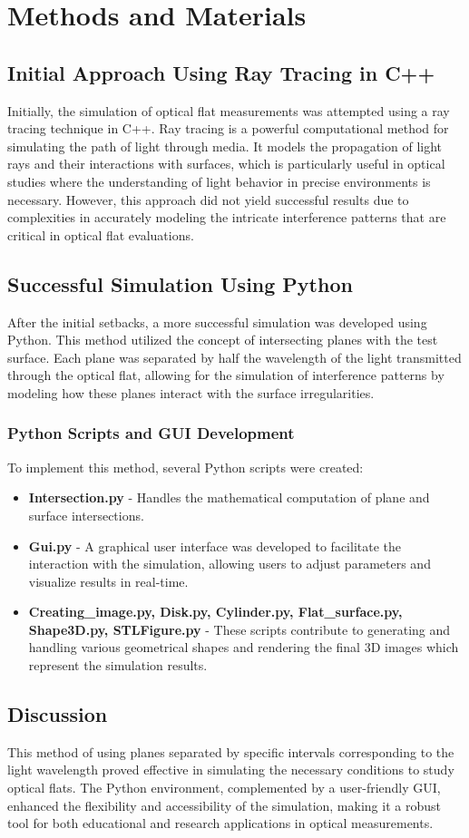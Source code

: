 \documentclass[../main.tex]{subfiles}
\begin{document}
\chapter{Methods and Materials}

\section{Initial Approach Using Ray Tracing in C++}
Initially, the simulation of optical flat measurements was attempted using a ray tracing technique in C++. Ray tracing is a powerful computational method for simulating the path of light through media. It models the propagation of light rays and their interactions with surfaces, which is particularly useful in optical studies where the understanding of light behavior in precise environments is necessary. However, this approach did not yield successful results due to complexities in accurately modeling the intricate interference patterns that are critical in optical flat evaluations.

\section{Successful Simulation Using Python}
After the initial setbacks, a more successful simulation was developed using Python. This method utilized the concept of intersecting planes with the test surface. Each plane was separated by half the wavelength of the light transmitted through the optical flat, allowing for the simulation of interference patterns by modeling how these planes interact with the surface irregularities.

\subsection{Python Scripts and GUI Development}
To implement this method, several Python scripts were created:
\begin{itemize}
    \item \textbf{Intersection.py} - Handles the mathematical computation of plane and surface intersections.
    \item \textbf{Gui.py} - A graphical user interface was developed to facilitate the interaction with the simulation, allowing users to adjust parameters and visualize results in real-time.
    \item \textbf{Creating\_image.py, Disk.py, Cylinder.py, Flat\_surface.py, Shape3D.py, STLFigure.py} - These scripts contribute to generating and handling various geometrical shapes and rendering the final 3D images which represent the simulation results.
\end{itemize}

\section{Discussion}
This method of using planes separated by specific intervals corresponding to the light wavelength proved effective in simulating the necessary conditions to study optical flats. The Python environment, complemented by a user-friendly GUI, enhanced the flexibility and accessibility of the simulation, making it a robust tool for both educational and research applications in optical measurements.
\end{document}

